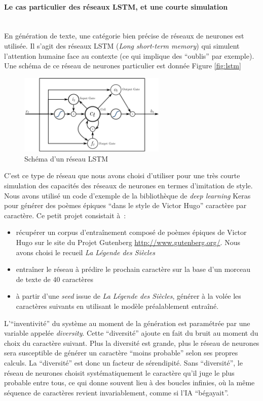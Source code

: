 \documentclass{article}
\newcommand{\subsubsubsection}[1]{\paragraph{#1}\mbox{}\\}
\begin{document}
				\subsubsubsection{Le cas particulier des réseaux LSTM, et une courte simulation}\label{lstm_hugo}
					En génération de texte, une catégorie bien précise de réseaux de neurones est utilisée. Il s'agit des réseaux LSTM (\textit{Long short-term memory}) qui simulent l'attention humaine face au contexte (ce qui implique des ``oublis'' par exemple). Une schéma de ce réseau de neurones particulier est donnée Figure \ref{fig:lstm}
					\begin{figure}
						\centering
						\includegraphics[width=7cm]{lstm.png}
						\caption{Schéma d'un réseau LSTM}
						\label{fi:lstm}
					\end{figure}
					C'est ce type de réseau que nous avons choisi d'utiliser pour une très courte simulation des capacités des réseaux de neurones en termes d'imitation de style. Nous avons utilisé un code d'exemple de la bibliothèque de \textit{deep learning} Keras pour générer des poèmes épiques ``dans le style de Victor Hugo'' caractère par caractère. Ce petit projet consistait à~:
					\begin{itemize}
						\item récupérer un corpus d'entraînement composé de poèmes épiques de Victor Hugo sur le site du Projet Gutenberg \href{http://www.gutenberg.org/}{http://www.gutenberg.org/}. Nous avons choisi le recueil \textit{La Légende des Siècles}
						\item entraîner le réseau à prédire le prochain caractère sur la base d'un morceau de texte de $40$ caractères
						\item à partir d'une \textit{seed} issue de \textit{La Légende des Siècles}, générer à la volée les caractères suivants en utilisant le modèle préalablement entraîné.
					\end{itemize}
					L'``inventivité'' du système au moment de la génération est paramétrée par une variable appelée \textit{diversity}. Cette ``diversité'' ajoute en fait du bruit au moment du choix du caractère suivant. Plus la diversité est grande, plus le réseau de neurones sera susceptible de générer un caractère ``moins probable'' selon ses propres calculs. La ``diversité'' est donc un facteur de sérendipité. Sans ``diversité'', le réseau de neurones choisit systématiquement le caractère qu'il juge le plus probable entre tous, ce qui donne souvent lieu à des boucles infinies, où la même séquence de caractères revient invariablement, comme si l'IA ``bégayait''.\\
					
\end{document}
